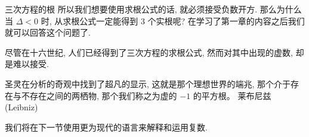 \begin{frame}{三次方程的根\noexer}
	\onslide<+->
	所以我们想要使用求根公式的话, 就\alert{必须接受负数开方}.
	\onslide<+->
	那么为什么当 $\Delta<0$ 时, 从求根公式一定能得到 $3$ 个实根呢?
	\onslide<+->
	在学习了第一章的内容之后我们就可以回答这个问题了.

	\onslide<+->
	尽管在十六世纪, 人们已经得到了三次方程的求根公式, 然而对其中出现的虚数, 却是难以接受.

	\onslide<+->
	\begin{tcolorbox}[
		borderline={0pt}{0pt}{fourth,cstdash},
		colbacktitle=fourth,
		fontlower=\itshape,
		halign lower=flush right,
		lower separated=true]
		圣灵在分析的奇观中找到了超凡的显示, 这就是那个理想世界的端兆, 那个介于存在与不存在之间的两栖物, 那个我们称之为虚的 $-1$ 的平方根。
		\tcblower
		莱布尼兹 (Leibniz)
	\end{tcolorbox}

	\onslide<+->
	我们将在下一节使用更为现代的语言来解释和运用复数.
\end{frame}
